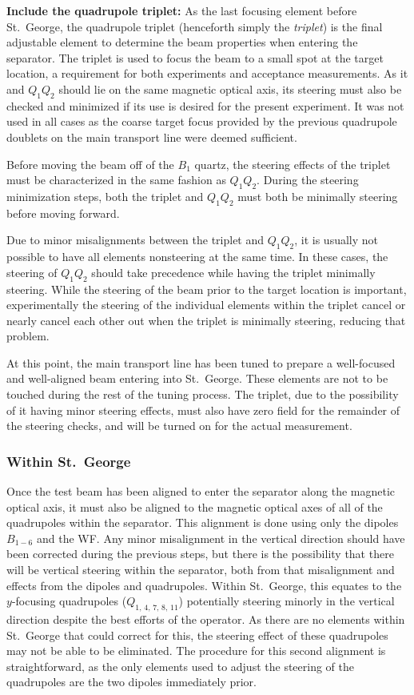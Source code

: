 \textbf{Include the quadrupole triplet:}
As the last focusing element before St.\ George, the quadrupole triplet
(henceforth simply the \emph{triplet}) is the final adjustable element to
determine the beam properties when entering the separator. The triplet is used
to focus the beam to a small spot at the target location, a requirement for
both experiments and acceptance measurements. As it and $Q_1Q_2$ should lie on
the same magnetic optical axis, its steering must also be checked and minimized
if its use is desired for the present experiment. It was not used in all cases
as the coarse target focus provided by the previous quadrupole doublets on the
main transport line were deemed sufficient.

Before moving the beam off of the $B_1$ quartz, the steering effects of the
triplet must be characterized in the same fashion as $Q_1Q_2$. During the
steering minimization steps, both the triplet and $Q_1Q_2$ must both be
minimally steering before moving forward.

Due to minor misalignments between the triplet and $Q_1Q_2$, it is usually not
possible to have all elements nonsteering at the same time. In these cases, the
steering of $Q_1Q_2$ should take precedence while having the triplet minimally
steering. While the steering of the beam prior to the target location is
important, experimentally the steering of the individual elements within the
triplet cancel or nearly cancel each other out when the triplet is minimally
steering, reducing that problem.

At this point, the main transport line has been tuned to prepare a well-focused
and well-aligned beam entering into St.\ George. These elements are not to be
touched during the rest of the tuning process. The triplet, due to the
possibility of it having minor steering effects, must also have zero field for
the remainder of the steering checks, and will be turned on for the actual
measurement.

\subsubsection{Within St.\ George}
\label{sec:tuning_stg}

Once the test beam has been aligned to enter the separator along the magnetic
optical axis, it must also be aligned to the magnetic optical axes of all of
the quadrupoles within the separator. This alignment is done using only the
dipoles $B_{1-6}$ and the WF. Any minor misalignment in the vertical
direction should have been corrected during the previous steps, but there is
the possibility that there will be vertical steering within the separator, both
from that misalignment and effects from the dipoles and
quadrupoles. Within St.\ George, this equates to the $y$-focusing quadrupoles
($Q_{1,\,4,\,7,\,8,\,11}$) potentially steering minorly in the vertical
direction despite the best efforts of the operator. As there are no elements
within St.\ George that could correct for this, the steering effect of these
quadrupoles may not be able to be eliminated. The procedure for this second
alignment is straightforward, as the
only elements used to adjust the steering of the quadrupoles are the two
dipoles immediately prior.

